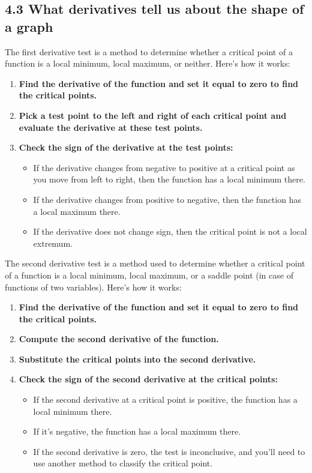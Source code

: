 \documentclass{article}
\begin{document}
\subsection{4.3 What derivatives tell us about the shape of a graph}


The first derivative test is a method to determine whether a critical point of a function is a local minimum, local maximum, or neither. Here's how it works:

\begin{enumerate}
    \item \textbf{Find the derivative of the function and set it equal to zero to find the critical points.}
    \item \textbf{Pick a test point to the left and right of each critical point and evaluate the derivative at these test points.}
    \item \textbf{Check the sign of the derivative at the test points:}
    \begin{itemize}
        \item If the derivative changes from negative to positive at a critical point as you move from left to right, then the function has a local minimum there.
        \item If the derivative changes from positive to negative, then the function has a local maximum there.
        \item If the derivative does not change sign, then the critical point is not a local extremum.
    \end{itemize}
\end{enumerate}


The second derivative test is a method used to determine whether a critical point of a function is a local minimum, local maximum, or a saddle point (in case of functions of two variables). Here's how it works:

\begin{enumerate}
    \item \textbf{Find the derivative of the function and set it equal to zero to find the critical points.}
    \item \textbf{Compute the second derivative of the function.}
    \item \textbf{Substitute the critical points into the second derivative.}
    \item \textbf{Check the sign of the second derivative at the critical points:}
    \begin{itemize}
        \item If the second derivative at a critical point is positive, the function has a local minimum there.
        \item If it's negative, the function has a local maximum there.
        \item If the second derivative is zero, the test is inconclusive, and you'll need to use another method to classify the critical point.
    \end{itemize}
\end{enumerate}
\end{document}
